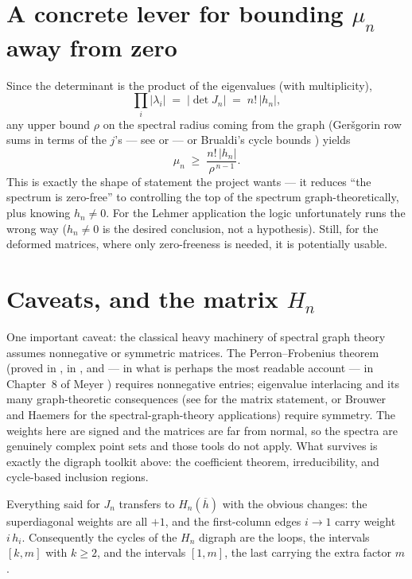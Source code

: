 \documentclass[11pt, fleqn]{amsart}
\theoremstyle{remark}
\begin{document}
\section{A concrete lever for bounding $\mu_n$ away from zero}

Since the determinant is the product of the eigenvalues (with
multiplicity),
\[
\prod_i |\lambda_i| \;=\; |\det J_n| \;=\; n!\,|h_n|,
\]
any upper bound $\rho$ on the spectral radius coming from the graph
(Ger\v{s}gorin row sums in terms of the $j$'s --- see
\cite[Ch.~6]{HJ13} or \cite[Ch.~1]{Varga04} --- or Brualdi's cycle
bounds \cite{Brualdi82}) yields
\[
\mu_n \;\ge\; \frac{n!\,|h_n|}{\rho^{\,n-1}}.
\]
This is exactly the shape of statement the project wants --- it reduces
``the spectrum is zero-free'' to controlling the top of the spectrum
graph-theoretically, plus knowing $h_n \neq 0$. For the Lehmer
application the logic unfortunately runs the wrong way ($h_n \neq 0$ is
the desired conclusion, not a hypothesis). Still, for the deformed
matrices, where only zero-freeness is needed, it is potentially usable.

\section{Caveats, and the matrix $H_n$}

One important caveat: the classical heavy machinery of spectral graph
theory assumes nonnegative or symmetric matrices. The
Perron--Frobenius theorem (proved in \cite[Ch.~8]{HJ13}, in
\cite[Ch.~2]{BP94}, and --- in what is perhaps the most readable
account --- in Chapter~8 of Meyer \cite{Meyer00}) requires nonnegative
entries; eigenvalue interlacing and its many graph-theoretic
consequences (see \cite[\S 4.3]{HJ13} for the matrix statement, or
Brouwer and Haemers \cite{BH12} for the spectral-graph-theory
applications) require symmetry. The weights here are signed and the
matrices are far from normal, so the spectra are genuinely complex
point sets and those tools do not apply. What survives is exactly the
digraph toolkit above: the coefficient theorem, irreducibility, and
cycle-based inclusion regions.

Everything said for $J_n$ transfers to $H_n(\overline{h})$ with the
obvious changes: the superdiagonal weights are all $+1$, and the
first-column edges $i \to 1$ carry weight $i\,h_i$. Consequently the
cycles of the $H_n$ digraph are the loops, the intervals $[k,m]$ with
$k \ge 2$, and the intervals $[1,m]$, the last carrying the extra
factor $m$.
\end{document}
